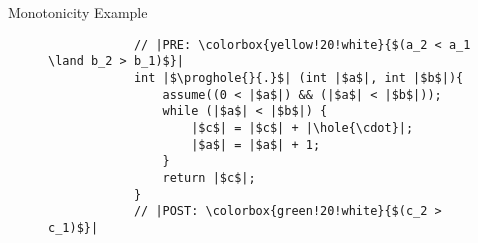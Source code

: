 \begin{frame}[fragile]{Monotonicity Example}
    \begin{figure}[t]
        \begin{verbatim}
            // |PRE: \colorbox{yellow!20!white}{$(a_2 < a_1 \land b_2 > b_1)$}|
            int |$\proghole{}{.}$| (int |$a$|, int |$b$|){
                assume((0 < |$a$|) && (|$a$| < |$b$|));
                while (|$a$| < |$b$|) {
                    |$c$| = |$c$| + |\hole{\cdot}|;
                    |$a$| = |$a$| + 1;
                }
                return |$c$|;
            }
            // |POST: \colorbox{green!20!white}{$(c_2 > c_1)$}|
        \end{verbatim}
        \label{list:prog:qbsynth}
    \end{figure}
\end{frame}
